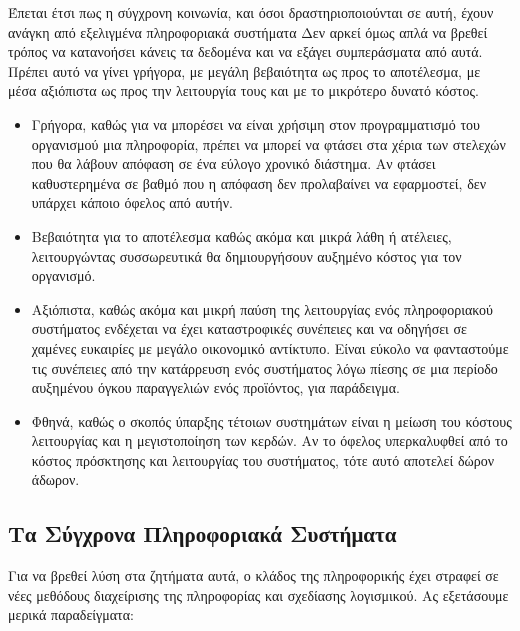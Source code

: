 \documentclass{article}
\begin{document}
Έπεται έτσι πως η σύγχρονη κοινωνία, και όσοι δραστηριοποιούνται σε αυτή, έχουν ανάγκη από εξελιγμένα πληροφοριακά συστήματα
Δεν αρκεί όμως απλά  να βρεθεί τρόπος να κατανοήσει κάνεις τα δεδομένα και να εξάγει συμπεράσματα από αυτά. Πρέπει αυτό να γίνει γρήγορα, με μεγάλη βεβαιότητα ως προς το αποτέλεσμα, με μέσα αξιόπιστα ως προς την λειτουργία τους και με το μικρότερο δυνατό κόστος.


\begin{itemize}
\item Γρήγορα, καθώς για να μπορέσει να είναι χρήσιμη στον προγραμματισμό του οργανισμού μια πληροφορία, πρέπει να μπορεί να φτάσει στα χέρια των στελεχών που θα λάβουν απόφαση σε ένα εύλογο χρονικό διάστημα. Αν φτάσει καθυστερημένα σε βαθμό που η απόφαση δεν προλαβαίνει να εφαρμοστεί, δεν υπάρχει κάποιο όφελος από αυτήν.
\item Βεβαιότητα για το αποτέλεσμα καθώς ακόμα και μικρά λάθη ή ατέλειες, λειτουργώντας συσσωρευτικά θα δημιουργήσουν αυξημένο κόστος για τον οργανισμό.
\item Αξιόπιστα, καθώς ακόμα και μικρή παύση της λειτουργίας ενός πληροφοριακού συστήματος ενδέχεται να έχει καταστροφικές συνέπειες και να οδηγήσει σε χαμένες ευκαιρίες με μεγάλο οικονομικό αντίκτυπο. Είναι εύκολο να φανταστούμε τις συνέπειες από την κατάρρευση ενός συστήματος λόγω πίεσης σε μια περίοδο αυξημένου όγκου παραγγελιών ενός προϊόντος, για παράδειγμα.
\item Φθηνά, καθώς ο σκοπός ύπαρξης τέτοιων συστημάτων είναι η μείωση του κόστους λειτουργίας και η μεγιστοποίηση των κερδών. Αν το όφελος υπερκαλυφθεί από το κόστος πρόσκτησης και λειτουργίας του συστήματος, τότε αυτό αποτελεί δώρον άδωρον.
\end{itemize}

\subsection{Τα Σύγχρονα Πληροφοριακά Συστήματα}
Για να βρεθεί λύση στα ζητήματα αυτά, ο κλάδος της πληροφορικής έχει στραφεί σε νέες  μεθόδους διαχείρισης της πληροφορίας και σχεδίασης λογισμικού. Ας εξετάσουμε μερικά παραδείγματα:
\end{document}
